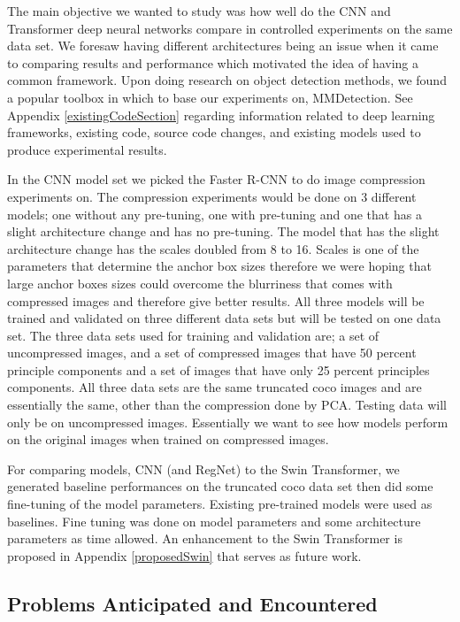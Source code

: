 \documentclass[10pt,twocolumn,letterpaper]{article}
\begin{document}
The main objective we wanted to study was how well do the CNN and Transformer deep neural networks compare in controlled experiments on the same data set. We foresaw having different architectures being an issue when it came to comparing results and performance which motivated the idea of having a common framework. Upon doing research on object detection methods, we found a popular toolbox in which to base our experiments on, MMDetection\cite{mmdetection}. See Appendix \ref{existingCodeSection} regarding information related to deep learning frameworks, existing code, source code changes, and existing models used to produce experimental results.

In the CNN model set we picked the Faster R-CNN to do image compression experiments on. The compression experiments would be done on 3 different models; one without any pre-tuning, one with pre-tuning and one that has a slight architecture change and has no pre-tuning. The model that has the slight architecture change has the scales doubled from 8 to 16. Scales is one of the parameters that determine the anchor box sizes therefore we were hoping that large anchor boxes sizes could overcome the blurriness that comes with compressed images and therefore give better results. All three models will be trained and validated on three different data sets but will be tested on one data set. The three data sets used for training and validation are; a set of  uncompressed images, and a set of compressed images that have 50 percent principle components and a set of images that have only 25 percent principles components. All three data sets are the same truncated coco images and are essentially the same, other than the compression done by PCA. Testing data will only be on uncompressed images. Essentially we want to see how models perform on the original images when trained on compressed images.

For comparing models, CNN (and RegNet) to the Swin Transformer, we generated baseline performances on the truncated coco data set then did some fine-tuning of the model parameters. Existing pre-trained models were used as baselines. Fine tuning was done on model parameters and some architecture parameters as time allowed. An enhancement to the Swin Transformer is proposed in Appendix \ref{proposedSwin} that serves as future work.

\subsection{Problems Anticipated and Encountered}
\end{document}
